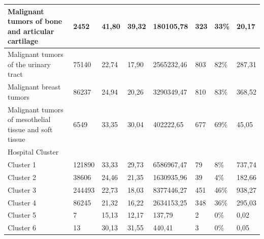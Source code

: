 \begin{table}[H]
{\begin{tabular}{|l|l|l|l|l|l|l|l|}
            Malignant tumors of bone and articular cartilage                                 & 2452    & 41,80           & 39,32           & 180105,78      & 323      & 33\%      & 20,17              \\ \hline
            Malignant tumors of the urinary tract                                            & 75140   & 22,74           & 17,90           & 2565232,46     & 803      & 82\%      & 287,31             \\ \hline
            Malignant breast tumors                                                          & 86237   & 24,94           & 20,26           & 3290349,47     & 810      & 83\%      & 368,52             \\ \hline
            Malignant tumors of mesothelial tissue and soft tissue                           & 6549    & 33,35           & 30,04           & 402222,65      & 677      & 69\%      & 45,05              \\ \hline
            Hospital Cluster                                                                 & ~       & ~               & ~               & ~              & ~        & ~         & ~                  \\ \hline
            Cluster 1                                                                        & 121890  & 33,33           & 29,73           & 6586967,47     & 79       & 8\%       & 737,74             \\ \hline
            Cluster 2                                                                        & 38606   & 24,46           & 21,35           & 1630935,96     & 39       & 4\%       & 182,66             \\ \hline
            Cluster 3                                                                        & 244493  & 22,73           & 18,03           & 8377446,27     & 451      & 46\%      & 938,27             \\ \hline
            Cluster 4                                                                        & 86245   & 21,32           & 16,22           & 2634153,25     & 348      & 36\%      & 295,03             \\ \hline
            Cluster 5                                                                        & 7       & 15,13           & 12,17           & 137,79         & 2        & 0\%       & 0,02               \\ \hline
            Cluster 6                                                                        & 13      & 30,13           & 31,55           & 440,41         & 3        & 0\%       & 0,05               \\ \hline

\end{tabular}}
\end{table}
